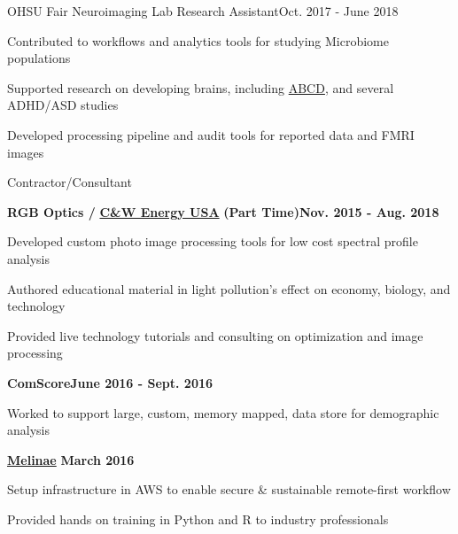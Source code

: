 \documentclass{article}
\newenvironment{**mylist}[2]{
  \subsubsection*{#1\hfill\small#2}
  \small
  \begin{list}{}{}
   \setlength{\topsep}{0pt}
   \setlength{\itemsep}{1pt}
   \setlength{\parskip}{0pt}
   \setlength{\parsep}{0pt}}{\end{list}\normalsize}
\newcommand{\LU}[1]{\hspace{-1em}{\bf Technologies : #1}}
\def\PT{{\bf(Part Time)}\xspace}
\begin{document}
\begin{**mylist}{OHSU Fair Neuroimaging Lab \tabb Research Assistant}{Oct. 2017 - June 2018}
\item Contributed to workflows and analytics tools for studying Microbiome populations
\item Supported research on developing brains, including \href{https://abcdstudy.org/}{ABCD}, and several ADHD/ASD studies
\item Developed processing pipeline and audit tools for reported data and FMRI images
\item \LU{Python, Bash, R, neo4j, ponyorm, stan, GitLab, Docker}
\end{**mylist}

\begin{**mylist}{Contractor/Consultant}{}
\item \hspace{-1em}
  {\bf{RGB Optics} / }\href{http://cwenergyusa.com/star-friendly/}{\bf{C\&W Energy USA}} \PT\hfill{\bf{Nov. 2015 - Aug. 2018}}
\item Developed custom photo image processing tools for low cost spectral profile analysis
\item Authored educational material in light pollution's effect on economy, biology, and technology
\item Provided live technology tutorials and consulting on optimization and image processing
\item \hspace{-1em}
  {\bf{ComScore}}\hfill{\bf{June 2016 - Sept. 2016}}
\item Worked to support large, custom, memory mapped, data store for demographic analysis
\item \hspace{-1em}
  \href{http://www.melinae.com/}{\bf{Melinae}} \hfill{\bf{March 2016}}
\item Setup infrastructure in AWS to enable secure \& sustainable remote-first workflow
\item Provided hands on training in Python and R to industry professionals
\item \LU{Python, numpy, skimage, R, AWS, PostgreSQL, Perl, C++, Jira, ZenHub}
\end{**mylist}
\end{document}

